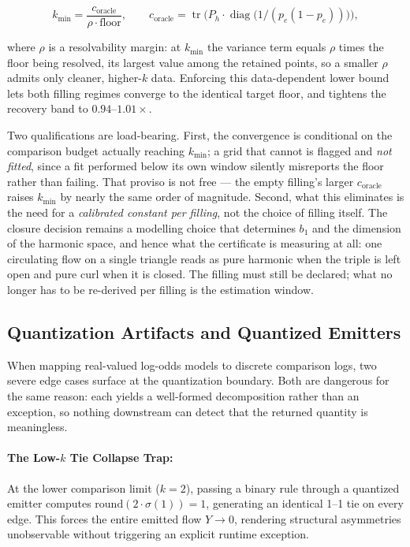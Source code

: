 \begin{equation}
k_{\min} = \frac{c_{\text{oracle}}}{\rho \cdot \text{floor}},
\qquad
c_{\text{oracle}} = \operatorname{tr}\!\Big(P_h \cdot
  \operatorname{diag}\big(1/(p_e(1-p_e))\big)\Big),
\label{eq:kmin}
\end{equation}

where $\rho$ is a resolvability margin: at $k_{\min}$ the variance term equals
$\rho$ times the floor being resolved, its largest value among the retained
points, so a smaller $\rho$ admits only cleaner, higher-$k$ data. Enforcing this
data-dependent lower bound lets both filling regimes converge to the identical
target floor, and tightens the recovery band to $0.94\text{--}1.01\times$.

Two qualifications are load-bearing. First, the convergence is conditional on the
comparison budget actually reaching $k_{\min}$; a grid that cannot is flagged and
\emph{not fitted}, since a fit performed below its own window silently misreports
the floor rather than failing. That proviso is not free --- the empty filling's
larger $c_{\text{oracle}}$ raises $k_{\min}$ by nearly the same order of
magnitude. Second, what this eliminates is the need for a \emph{calibrated
constant per filling}, not the choice of filling itself. The closure decision
remains a modelling choice that determines $b_1$ and the dimension of the
harmonic space, and hence what the certificate is measuring at all: one
circulating flow on a single triangle reads as pure harmonic when the triple is
left open and pure curl when it is closed. The filling must still be declared;
what no longer has to be re-derived per filling is the estimation window.

\subsection{Quantization Artifacts and Quantized Emitters}
When mapping real-valued log-odds models to discrete comparison logs, two severe
edge cases surface at the quantization boundary. Both are dangerous for the same
reason: each yields a well-formed decomposition rather than an exception, so
nothing downstream can detect that the returned quantity is meaningless.

\paragraph{The Low-$k$ Tie Collapse Trap:} At the lower comparison limit
($k = 2$), passing a binary rule through a quantized emitter computes
$\text{round}(2 \cdot \sigma(1)) = 1$, generating an identical 1--1 tie on every
edge. This forces the entire emitted flow $Y \to 0$, rendering structural
asymmetries unobservable without triggering an explicit runtime exception.

